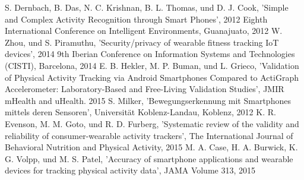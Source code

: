 \documentclass[conference]{IEEEtran}
\begin{document}
\begin{thebibliography}{00}
 S. Dernbach, B. Das, N. C. Krishnan, B. L. Thomas, und D. J. Cook, 'Simple and Complex Activity Recognition through Smart Phones', 2012 Eighth International Conference on Intelligent Environments, Guanajuato, 2012
 W. Zhou, und S. Piramuthu, 'Security/privacy of wearable fitness tracking IoT devices', 2014 9th Iberian Conference on Information Systems and Technologies (CISTI), Barcelona, 2014
 E. B. Hekler, M. P. Buman, und L. Grieco, 'Validation of Physical Activity Tracking via Android Smartphones Compared to ActiGraph Accelerometer: Laboratory-Based and Free-Living Validation Studies', JMIR mHealth and uHealth. 2015
 S. Milker, 'Bewegungserkennung mit Smartphones mittels deren Sensoren', Universität Koblenz-Landau, Koblenz, 2012
 K. R. Evenson, M. M. Goto, und R. D. Furberg, 'Systematic review of the validity and reliability of consumer-wearable activity trackers', The International Journal of Behavioral Nutrition and Physical Activity, 2015
 M. A. Case, H. A. Burwick, K. G. Volpp, und M. S. Patel, 'Accuracy of smartphone applications and wearable devices for tracking physical activity data', JAMA Volume 313, 2015
\end{thebibliography}
\end{document}
